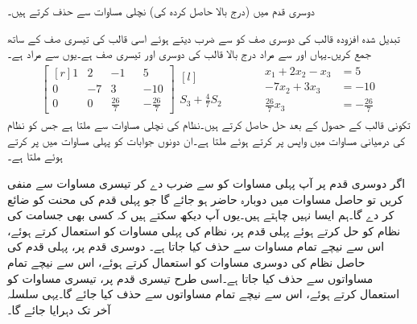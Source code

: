 دوسری قدم میں (درج بالا حاصل کردہ کی) نچلی مساوات سے  حذف کرتے ہیں۔

تبدیل شدہ افزودہ قالب کی دوسری صف کو  سے ضرب دیتے ہوئے اسی قالب کی تیسری صف کے ساتھ جمع  کریں۔یہاں  اور  سے مراد درج بالا قالب کی دوسری اور تیسری صف ہے۔یوں  سے مراد  ہے۔
\begin{gather}\label{مساوات_الجبرا_مثال_گاوسی_اسقاط_الف}
\begin{bmatrix*}[r] 1&2&-1&&5\\0&-7&3&&-10\\0&0&\frac{26}{7}&&-\frac{26}{7}  \end{bmatrix*}\begin{matrix*}[l]  \\ \\S_3+\frac{4}{7}S_2\end{matrix*}\quad \quad\quad
\begin{aligned}
x_1+2x_2-x_3&=5\\
-7x_2+3x_3&=-10\\
\frac{26}{7}x_3&=-\frac{26}{7}
\end{aligned}
\end{gather}
تکونی قالب کے حصول کے بعد حل حاصل کرتے ہیں۔نظام  کی نچلی مساوات سے  ملتا ہے جس کو نظام  کی درمیانی مساوات میں واپس پر کرتے ہوئے  ملتا ہے۔ان دونوں جوابات کو پہلی مساوات میں پر کرتے ہوئے  ملتا ہے۔

اگر دوسری قدم پر آپ پہلی مساوات کو  سے ضرب دے کر تیسری مساوات سے منفی کریں تو حاصل مساوات میں  دوبارہ حاضر ہو جائے گا جو پہلی قدم کی محنت کو ضائع کر دے گا۔ہم ایسا نہیں چاہتے ہیں۔یوں آپ دیکھ سکتے ہیں کہ کسی بھی جسامت کی نظام کو حل کرتے ہوئے  پہلی قدم پر، نظام کی پہلی مساوات کو استعمال کرتے ہوئے، اس سے نیچے تمام مساوات سے  حذف کیا جاتا ہے۔ دوسری قدم پر، پہلی قدم کی حاصل نظام کی دوسری مساوات کو استعمال کرتے ہوئے، اس سے نیچے تمام مساواتوں سے  حذف کیا جاتا ہے۔اسی طرح تیسری قدم پر، تیسری مساوات کو استعمال کرتے ہوئے، اس سے نیچے تمام مساواتوں سے  حذف کیا جائے گا۔یہی سلسلہ آخر تک دہرایا جائے گا۔

